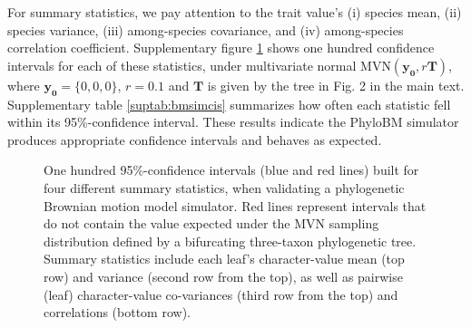 \documentclass[oneside]{article}
\begin{document}
For summary statistics, we pay attention to the trait value's (i) species mean, (ii) species variance, (iii) among-species covariance, and (iv) among-species correlation coefficient.
Supplementary figure \ref{supfig:bmsimcis} shows one hundred confidence intervals for each of these statistics, under multivariate normal $\text{MVN}(\boldsymbol{y_0},r\boldsymbol{T})$, where $\boldsymbol{y_0}=\{0,0,0\}$, $r=0.1$ and $\boldsymbol{T}$ is given by the tree in Fig. 2 in the main text.
Supplementary table \ref{suptab:bmsimcis} summarizes how often each statistic fell within its 95\%-confidence interval.
These results indicate the PhyloBM simulator produces appropriate confidence intervals and behaves as expected.

\begin{figure}
  \centering
  
  \caption{One hundred 95\%-confidence intervals (blue and red lines) built for four different summary statistics, when validating a phylogenetic Brownian motion model simulator.
    Red lines represent intervals that do not contain the value expected under the MVN sampling distribution defined by a bifurcating three-taxon phylogenetic tree.
    Summary statistics include each leaf's character-value mean (top row) and variance (second row from the top), as well as pairwise (leaf) character-value co-variances (third row from the top) and correlations (bottom row).}
  \label{supfig:bmsimcis}
\end{figure}
\end{document}
